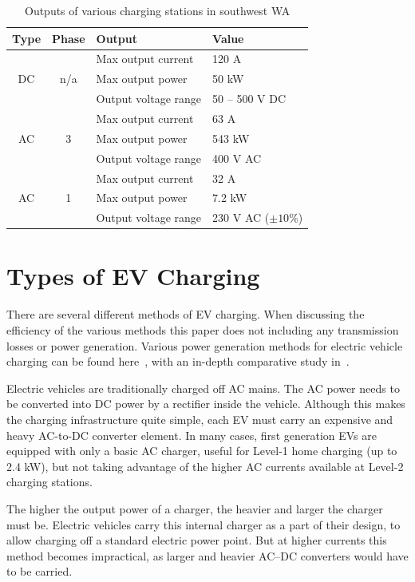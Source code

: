 \begin{table}[H]
	\centering
	\caption{Outputs of various charging stations in southwest WA}
	\label{tbl:10:op}
	\begin{tabular}{ccll}
		\toprule
		Type & Phase & Output & Value \\
		\midrule
		\multirow{3}{*}{DC} & \multirow{3}{*}{n/a} & Max output current   & 120 A\\
		& & Max output power     & 50 kW          \\
		& & Output voltage range & 50 -- 500 V DC \\
		\midrule
		\multirow{3}{*}{AC} & \multirow{3}{*}{3} & Max output current   & 63 A     \\
		& & 	Max output power     & 543 kW   \\
		& &			Output voltage range & 400 V AC \\
		\midrule
		\multirow{3}{*}{AC} & \multirow{3}{*}{1} & Max output current   & 32 A     \\
		& &			Max output power     & 7.2 kW   \\
		& &			Output voltage range & 230 V AC ($\pm 10\%$)\\
		\bottomrule
	\end{tabular}
\end{table}

\section{Types of EV Charging}
\label{sec:10:evcharging}
There are several different methods of EV charging. When discussing the efficiency of the various methods this paper does not including any transmission losses or power generation. Various power generation methods for electric vehicle charging can be found here~\cite{speidel_leaving_2016, dell_towards_2014}, with an in-depth comparative study in~\cite{martinez-lao_electric_2017}.  

Electric vehicles are traditionally charged off AC mains. The AC power needs to be converted into DC power by a rectifier inside the vehicle. Although this makes the charging infrastructure quite simple, each EV must carry an expensive and heavy AC-to-DC converter element. In many cases, first generation EVs are equipped with only a basic AC charger, useful for Level-1 home charging (up to 2.4 kW), but not taking advantage of the higher AC currents available at Level-2 charging stations.

The higher the output power of a charger, the heavier and larger the charger must be. Electric vehicles carry this internal charger as a part of their design, to allow charging off a standard electric power point. But at higher currents this method becomes impractical, as larger and heavier AC–DC converters would have to be carried. 

